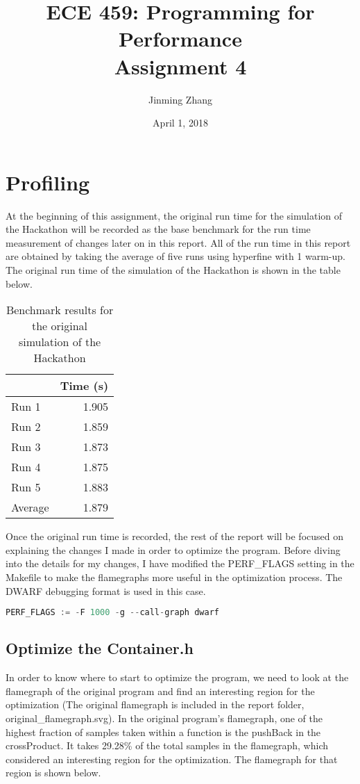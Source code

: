 \documentclass[12pt]{article}
\title{ECE 459: Programming for Performance\\Assignment 4}
\author{Jinming Zhang}
\date{April 1, 2018}
\begin{document}
\maketitle
\section{Profiling}
At the beginning of this assignment, the original run time for the simulation of the Hackathon will be recorded as the base benchmark for the run time measurement of changes later on in this report. All of the run time in this report are obtained by taking the average of five runs using hyperfine with 1 warm-up. The original run time of the simulation of the Hackathon is shown in the table below.

\begin{table}[H]
  \centering
  \begin{tabular}{lr}
    & {\bf Time (s)} \\
    \hline
    Run 1 & 1.905 \\
    Run 2 & 1.859 \\
    Run 3 & 1.873 \\
    Run 4 & 1.875 \\
    Run 5 & 1.883 \\
    \hline
    Average & 1.879 \\
  \end{tabular}
  \caption{Benchmark results for the original simulation of the Hackathon}
  \label{tbl-fib-sequential}
\end{table}

\noindent
Once the original run time is recorded, the rest of the report will be focused on explaining the changes I made in order to optimize the program. Before diving into the details for my changes, I have modified the PERF\_FLAGS setting in the Makefile to make the flamegraphs more useful in the optimization process. The DWARF debugging format is used in this case. 

 \begin{lstlisting}[language=c]
 PERF_FLAGS := -F 1000 -g --call-graph dwarf
 \end{lstlisting}
 
\subsection{Optimize the Container.h}
\noindent
In order to know where to start to optimize the program, we need to look at the flamegraph of the original program and find an interesting region for the optimization (The original flamegraph is included in the report folder, original\_flamegraph.svg). In the original program's flamegraph, one of the highest fraction of samples taken within a function is the pushBack in the crossProduct. It takes 29.28\% of the total samples in the flamegraph, which considered an interesting region for the optimization. The flamegraph for that region is shown below.
\end{document}
